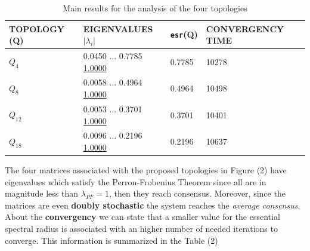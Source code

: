 \begin{table}[h]\label{table:analysis}
    \centering
    \begin{tabular}{| p{3.5cm} | p{5.5cm} |p{2cm} |p{5cm} | }
        \hline
        \textbf{TOPOLOGY (Q)}&\textbf{EIGENVALUES $\vert \lambda_i \vert$}&\textbf{\texttt{esr}(Q)}&\textbf{CONVERGENCY TIME}\\
        \hline
        {\Large  $Q_4$}&{\small
            0.0450 ...
    0.7785
    \underline{1.0000}
        }&      {0.7785}&       { 10278}\\
        \hline
        {\Large  $Q_8$}&{\small
            0.0058 ...
    0.4964
    \underline{1.0000}
        }&    { 0.4964}&{ 10498}\\
        \hline
        {\Large $Q_{12}$}&{\small
            0.0053 ...
    0.3701
    \underline{1.0000}
        }&  { 0.3701}&{  10401}\\
        \hline
        {\Large  $Q_{18}$}&{\small
            0.0096 ...
        0.2196
        \underline{1.0000}}&   { 0.2196}&{10637}\\
        \hline
    \end{tabular}
    \caption{Main results for the analysis of the four topologies}
\end{table}

\noindent
The four matrices associated with the proposed topologies in Figure (2) have eigenvalues which satisfy the Perron-Frobenius Theorem since all are in magnitude less than $\lambda_{PF}=1$, then they reach consensus. Moreover, since the matrices are even \textbf{doubly stochastic} the system reaches the \textit{average consensus}.
About the \textbf{convergency} we can state that a smaller value for the essential spectral radius is associated with an higher number of needed iterations to converge. This information is summarized in the Table (2) 

